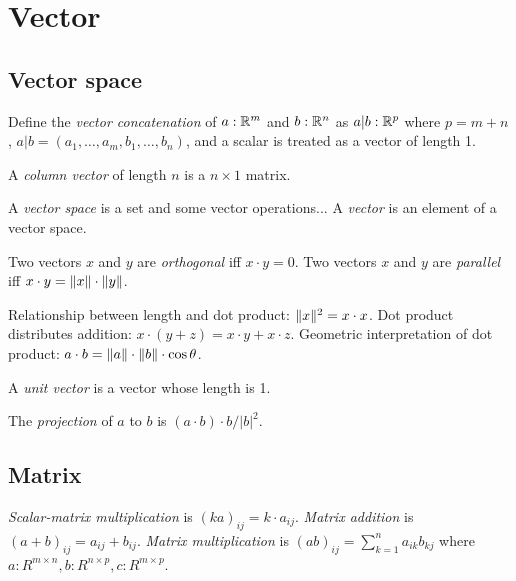 \chapter{Vector}

\section{Vector space}

%
%
%
Define the \emph{vector concatenation} of \(a : \mathbb{R}^m\) and \(b : \mathbb{R}^n\)
as \(a|b : \mathbb{R}^p\)
where \(p = m + n\),
\(a|b = (a_1 , \ldots , a_m , b_1 , \ldots , b_n)\),
and a scalar is treated as a vector of length 1.

%
%
A \emph{column vector} of length \(n\) is a \(n \times 1\) matrix.

%
%
A \emph{vector space} is a set and some vector operations...
%
A \emph{vector} is an element of a vector space.

%
%
Two vectors \(x\) and \(y\) are \emph{orthogonal} iff \(x \cdot y = 0\).
%
%
Two vectors \(x\) and \(y\) are \emph{parallel} iff \(x \cdot y = \lVert x\rVert \cdot \lVert y\rVert\).

%
%
Relationship between length and dot product: \(\lVert x\rVert^2 = x \cdot x\).
Dot product distributes addition: \(x \cdot (y+z) = x \cdot y + x \cdot z\).
Geometric interpretation of dot product: \(a \cdot b = \lVert a\rVert \cdot \lVert b\rVert \cdot \cos \theta\).

%
%
A \emph{unit vector} is a vector whose length is 1.

%
%
%
The \emph{projection} of \(a\) to \(b\) is \((a \cdot b) \cdot b / |b|^2\).

\section{Matrix}

%
\emph{Scalar-matrix multiplication} is \((ka)_{ij} = k \cdot a_{ij}\).
%
%
%
\emph{Matrix addition} is \((a + b)_{ij} = a_{ij} + b_{ij}\).
%
%
%
\emph{Matrix multiplication} is \((ab)_{ij} = \sum_{k=1}^n a_{ik} b_{kj}\) where
\(a : R^{m \times n}, b : R^{n \times p}, c : R^{m \times p}\).

